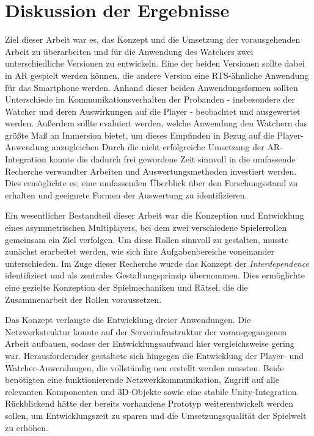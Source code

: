 \chapter{Diskussion der Ergebnisse}\label{sec:discussion}
Ziel dieser Arbeit war es, das Konzept und die Umsetzung der vorausgehenden Arbeit zu überarbeiten und für die Anwendung des Watchers zwei unterschiedliche Versionen zu entwickeln. Eine der beiden Versionen sollte dabei in \ac{AR} gespielt werden können, die andere Version eine \ac{RTS}-ähnliche Anwendung für das Smartphone werden. Anhand dieser beiden Anwendungsformen sollten Unterschiede im Kommunikationsverhalten der Probanden - insbesondere der Watcher und deren Auswirkungen auf die Player - beobachtet und ausgewertet werden. Außerdem sollte evaluiert werden, welche Anwendung den Watchern das größte Maß an Immersion bietet, um dieses Empfinden in Bezug auf die Player-Anwendung anzugleichen
Durch die nicht erfolgreiche Umsetzung der \ac{AR}-Integration konnte die dadurch frei gewordene Zeit sinnvoll in die umfassende Recherche verwandter Arbeiten und Auswertungsmethoden investiert werden. Dies ermöglichte es, eine umfassenden Überblick über den Forschungsstand zu erhalten und geeignete Formen der Auswertung zu identifizieren.

Ein wesentlicher Bestandteil dieser Arbeit war die Konzeption und Entwicklung eines asymmetrischen Multiplayers, bei dem zwei verschiedene Spielerrollen gemeinsam ein Ziel verfolgen. Um diese Rollen sinnvoll zu gestalten, musste zunächst erarbeitet werden, wie sich ihre Aufgabenbereiche voneinander unterschieden. Im Zuge dieser Recherche wurde das Konzept der \textit{Interdependence} identifiziert und als zentrales Gestaltungsprinzip übernommen. Dies ermöglichte eine gezielte Konzeption der Spielmechaniken und Rätsel, die die Zusammenarbeit der Rollen voraussetzen.

Das Konzept verlangte die Entwicklung dreier Anwendungen. Die Netzwerkstruktur konnte auf der Serverinfrastruktur der vorausgegangenen Arbeit aufbauen, sodass der Entwicklungsaufwand hier vergleichsweise gering war. Herausfordernder gestaltete sich hingegen die Entwicklung der Player- und Watcher-Anwendungen, die vollständig neu erstellt werden mussten. Beide benötigten eine funktionierende Netzwerkkommunikation, Zugriff auf alle relevanten Komponenten und \ac{3D}-Objekte sowie eine stabile Unity-Integration. Rückblickend hätte der bereits vorhandene Prototyp weiterentwickelt werden sollen, um Entwicklungszeit zu sparen und die Umsetzungsqualität der Spielwelt zu erhöhen.

